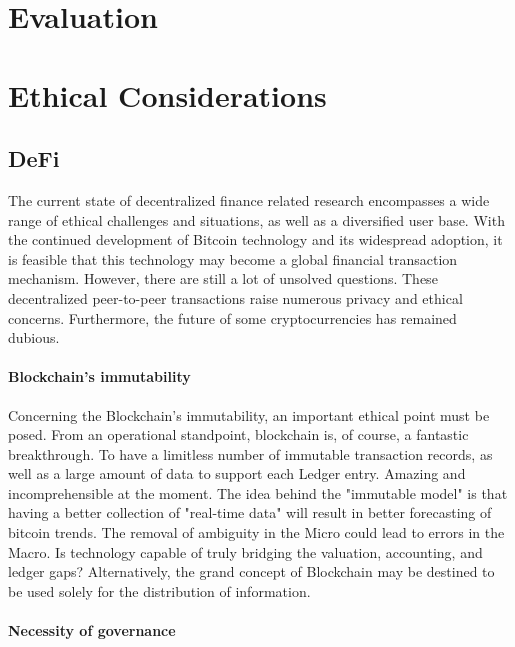 \documentclass[10pt,twocolumn]{article}
\begin{document}
\section{Evaluation}



\section{Ethical Considerations}

\subsection{DeFi}
The current state of decentralized finance related research encompasses a wide range of ethical challenges and situations, as well as a diversified user base. With the continued development of Bitcoin technology and its widespread adoption, it is feasible that this technology may become a global financial transaction mechanism. However, there are still a lot of unsolved questions. These decentralized peer-to-peer transactions raise numerous privacy and ethical concerns. Furthermore, the future of some cryptocurrencies has remained dubious.\cite{FabianDeFi}
\paragraph{Blockchain's immutability}
Concerning the Blockchain's immutability, an important ethical point must be posed. From an operational standpoint, blockchain is, of course, a fantastic breakthrough. To have a limitless number of immutable transaction records, as well as a large amount of data to support each Ledger entry. Amazing and incomprehensible at the moment. The idea behind the "immutable model" is that having a better collection of "real-time data" will result in better forecasting of bitcoin trends. The removal of ambiguity in the Micro could lead to errors in the Macro. Is technology capable of truly bridging the valuation, accounting, and ledger gaps? Alternatively, the grand concept of Blockchain may be destined to be used solely for the distribution of information.
\paragraph{Necessity of governance}
\end{document}
